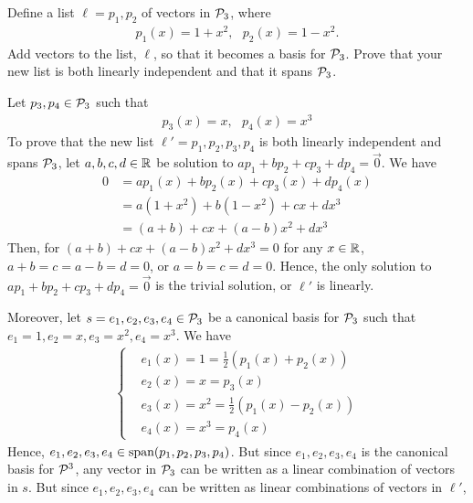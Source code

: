 \begin{question}
	\normalfont
	
	
	Define a list $\ell = p_1, p_2$ \hspace{.1cm}of vectors in $\P_3$, where
	\begin{align*}
		p_1(x) = 1+x^2,\ \ \ 
		p_2(x) = 1-x^2.
	\end{align*}
	Add vectors to the list, $\ell$, so that it becomes a basis for $\P_3$.  Prove that your new list is both linearly independent and that it spans $\P_3$.
\end{question}

\begin{sol}
    Let $p_3,p_4\in\P_3$ such that 
    \[
        \begin{aligned}
            p_3(x)=x,\ \ \
            p_4(x)=x^3
        \end{aligned}
    \]
    To prove that the new list $\ell'=p_1,p_2,p_3,p_4$ is both linearly independent and spans $\P_3$, let $a,b,c,d\in\R$ be solution to $ap_1+bp_2+cp_3+dp_4=\vec{0}$. We have 
    \[
        \begin{aligned}
            0 &= ap_1(x)+bp_2(x)+cp_3(x)+dp_4(x)\\
              &= a(1+x^2)+b(1-x^2)+cx+dx^3\\
              &= (a+b)+cx+(a-b)x^2+dx^3   
        \end{aligned}
    \]
    Then, for $(a+b)+cx+(a-b)x^2+dx^3=0$ for any $x\in\R$, $a+b=c=a-b=d=0$, or $a=b=c=d=0$. Hence, the only solution to $ap_1+bp_2+cp_3+dp_4=\vec{0}$ is the trivial solution, or $\ell'$ is linearly.

    Moreover, let $s=e_1,e_2,e_3,e_4\in\P_3$ be a canonical basis for $\P_3$ such that $e_1=1,e_2=x,e_3=x^2,e_4=x^3$. We have
    \begin{align*}
        \begin{cases}
            &e_1(x)=1=\frac{1}{2}(p_1(x)+p_2(x))\\
            &e_2(x)=x=p_3(x)\\
            &e_3(x)=x^2=\frac{1}{2}(p_1(x)-p_2(x))\\
            &e_4(x)=x^3=p_4(x)
        \end{cases}
    \end{align*}
    Hence, $e_1,e_2,e_3,e_4\in\SpanLA(p_1,p_2,p_3,p_4)$. But since $e_1,e_2,e_3,e_4$ is the canonical basis for $\P^3$, any vector in $\P_3$ can be written as a linear combination of vectors in $s$. But since $e_1,e_2,e_3,e_4$ can be written as linear combinations of vectors in $\ell'$, 
\end{sol}
